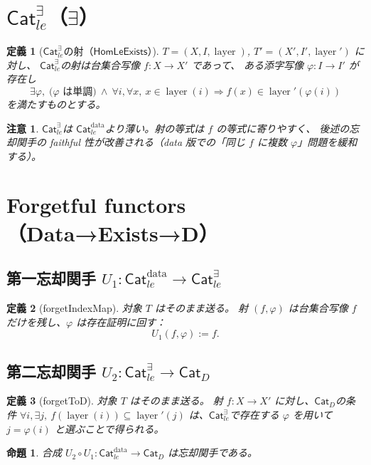 \documentclass[a4paper,12pt]{ltjsarticle}
\newtheorem{definition}{定義}[section]
\newtheorem{proposition}{命題}[section]
\newtheorem{remark}{注意}[section]
\newcommand{\HomLeExists}{\ensuremath{\mathsf{HomLeExists}}}
\newcommand{\CatD}{\ensuremath{\mathsf{Cat}_D}}
\newcommand{\Catledata}{\ensuremath{\mathsf{Cat}_{le}^{\text{data}}}}
\newcommand{\Catleexists}{\ensuremath{\mathsf{Cat}_{le}^{\exists}}}
\newcommand{\layer}{\operatorname{layer}}
\begin{document}
\section{\Catleexists（$\exists$）}

\begin{definition}[\Catleexists の射（\HomLeExists）]
\(T=(X,I,\layer)\), \(T'=(X',I',\layer')\) に対し、
\Catleexists の射は台集合写像 \(f:X\to X'\) であって、
ある添字写像 \(\varphi:I\to I'\) が存在し
\[
\exists \varphi,\;
\bigl(\varphi \text{ は単調}\bigr)\ \wedge\
\forall i,\forall x,\ x\in\layer(i)\Rightarrow f(x)\in\layer'(\varphi(i))
\]
を満たすものとする。
\end{definition}

\begin{remark}
\Catleexists は \Catledata より薄い。射の等式は \(f\) の等式に寄りやすく、
後述の忘却関手の faithful 性が改善される（data 版での「同じ \(f\) に複数 \(\varphi\)」問題を緩和する）。
\end{remark}

\section{Forgetful functors（Data→Exists→D）}

\subsection{第一忘却関手 \(U_1 : \Catledata \to \Catleexists\)}
\begin{definition}[forgetIndexMap]
対象 \(T\) はそのまま送る。
射 \((f,\varphi)\) は台集合写像 \(f\) だけを残し、\(\varphi\) は存在証明に回す：
\[
U_1(f,\varphi) := f.
\]
\end{definition}

\subsection{第二忘却関手 \(U_2 : \Catleexists \to \CatD\)}
\begin{definition}[forgetToD]
対象 \(T\) はそのまま送る。
射 \(f:X\to X'\) に対し、\CatD の条件
\(\forall i,\exists j,\ f(\layer(i))\subseteq \layer'(j)\)
は、\Catleexists で存在する \(\varphi\) を用いて \(j=\varphi(i)\) と選ぶことで得られる。
\end{definition}

\begin{proposition}
合成 \(U_2\circ U_1 : \Catledata \to \CatD\) は忘却関手である。
\end{proposition}
\end{document}
